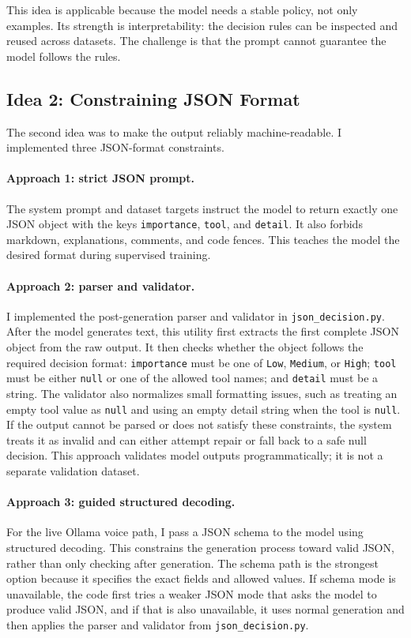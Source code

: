\documentclass[11pt,a4paper]{article}
\begin{document}
This idea is applicable because the model needs a stable policy, not only examples. Its strength is interpretability: the decision rules can be inspected and reused across datasets. The challenge is that the prompt cannot guarantee the model follows the rules.

\subsection{Idea 2: Constraining JSON Format}

The second idea was to make the output reliably machine-readable. I implemented three JSON-format constraints.

\paragraph{Approach 1: strict JSON prompt.}
The system prompt and dataset targets instruct the model to return exactly one JSON object with the keys \texttt{importance}, \texttt{tool}, and \texttt{detail}. It also forbids markdown, explanations, comments, and code fences. This teaches the model the desired format during supervised training.

\paragraph{Approach 2: parser and validator.}
I implemented the post-generation parser and validator in \texttt{json\_decision.py}. After the model generates text, this utility first extracts the first complete JSON object from the raw output. It then checks whether the object follows the required decision format: \texttt{importance} must be one of \texttt{Low}, \texttt{Medium}, or \texttt{High}; \texttt{tool} must be either \texttt{null} or one of the allowed tool names; and \texttt{detail} must be a string. The validator also normalizes small formatting issues, such as treating an empty tool value as \texttt{null} and using an empty detail string when the tool is \texttt{null}. If the output cannot be parsed or does not satisfy these constraints, the system treats it as invalid and can either attempt repair or fall back to a safe null decision. This approach validates model outputs programmatically; it is not a separate validation dataset.

\paragraph{Approach 3: guided structured decoding.}
For the live Ollama voice path, I pass a JSON schema to the model using structured decoding. This constrains the generation process toward valid JSON, rather than only checking after generation. The schema path is the strongest option because it specifies the exact fields and allowed values. If schema mode is unavailable, the code first tries a weaker JSON mode that asks the model to produce valid JSON, and if that is also unavailable, it uses normal generation and then applies the parser and validator from \texttt{json\_decision.py}.
\end{document}
